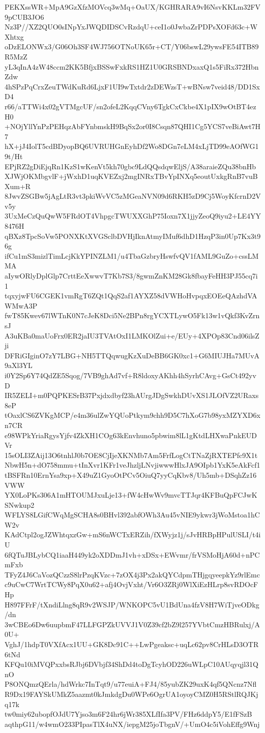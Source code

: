 PEKXssWR+MpA9GzXfzMOVcq3wMq+OaUX/KGHRARA9vI6NsvKKLm32FV9pCUB3JO6
Nz3P//XZ2QUO0sINpYxJWQDIDSCvRzdqU+ceI1o0JwbaZrPDPsXOFd63c+WXhtxg
oDzELONWx3/G06Oh3SF4WJ756OTNoUK65r+CT/Y06bswL29ywsFE54ITB89R5MzZ
yL3qInA4zW48ccm2KK5BfjxBSSwFxkRS1HZ1U0GRSBNDxaxQ1s5FiRx372HbnZdw
4hSPzPqCrxZeuTWdKuRd6LjxF1UI9wTxtdr2zDEWzsT+wBNsw7veid48/DD1SxD4
r66/aTTWi4x02gVTMgcUF/sn2ofeL2KqqCVny6TgkCxCkbe4X1pIX9wOtBT4ezH0
+NOjYllYnPzPEHqzAbFYnbmskH9BqSx2or0I8Csqn87QHI1Cg5YCS7veBiAwt7H7
hX+jJ4IolT5cdBDyopBQ6UVRUHGnEyhDf2Wo8DGn7eLM4xLjTD99eAOfWG19t/Ht
EPjRZ2gDiEjqRn1KzS1wKenVt5kh70gbc9LdQQsdqwEljS/A38araieZQu38bnHb
XJWjOKMbgvlF+jWxhD1uqKVEZxj2mgINRxTBvYpINXq5eoutUxkgRnB7vuBXum+R
8JwvZSGBw5jAgLtR3vt3pkiWvVC5zMGeaNVN09d6RKH5zD9Cj5WoyKfcrnD2Vv5y
3UxMeCzQuQwW5FRdOT4VhpgcTWUXXGhP75Ioxn7X1jjyZeoQ9iyu2+LE4YY8476H
qBXz8TpcSoVw5PONXKtXVGSclbDVHjIknAtmyIMuf6dhD1HzqP3in0Up7Kx3t96g
ifCu1mS3mizlTimLcjKkYPINZLM1/u4TbaGzbryHswfvQV1fAML9GuZo+cssLMMA
aIywORlyDplGlp7CrttEeXwwvT7Kb7S3/8gwmZnKM28Gk8fbayFeHH3PJ55cq7i1
tqxyjwFU6CGEK1vmRgT6ZQt1QqS2af1AYXZ58dVWHoHvpqxEOEeQAzhdVAWMwA3P
fwT85Kwev67lWTnK0N7cJeK8Dci5Ne2BPn8rgYCXTLywO5Fk13w1vQkf3KvZrnsJ
A3uKBa0maUoFrx0ER2jaIU3TVAtOxI1LMKOlZui+e/EUy+4XPOp83Cnd06ilsZji
DFRiGIginO7zY7LBG+NH5TTQqwugKzXuDeBB6GK0xc1+G6MIUJHa7MUvA9aXl3YL
i0Y2Sp6Y74QdZE5Sqog/7VB9ghAd7vf+R8ldoxyAKhh4hSyrhCAvg+GsCt492yvD
IR5ZELI+m0PQPKESrB37Pxjdxdbyf23hAUrgJDgSwkhDUvXS1JLOfVZ2URaxs8eP
tOaxlCS6ZVKgMCP/e4m36ulZwYQUoPtkym9chh9D5C7hXoG7b98yxMZYXD6xn7CR
e98WPkYriaRgysYjfv4ZkXH1COg63kEnvhuno5pbwim8lL1gKtdLHXwaPnkEUDVr
15sOLI3ZAij13O6tnhlJ0b7OE8CjIjeXKNMb7Am5FrfLogCtTNaZjRXTEPfc9X1t
NbwH5n+dO758mmu+tInXvr1KFr1veJhzljLNvjiwwwHlxJA9OIpb1YxK5eAkFcf1
tBSFRn10ErnYsa9xp+X49uZ1GyoOtPCv5OiuQ7yyCqKbv8/Uh5mb+DSqhZz16VWW
YX0LoPKs306A1mHTOUMJxuLje13+fW4cHwWv9mvcTTJqr4KFBuQpFCJwKSNwkup2
WFLYS8LGifCWqMgSCHA8s0BHvl392abfOWh3Au45vNIE9ykwr3jWoMstoa1hCW2v
KAdCtpl2ogJZWhtqxzGw+mS6nWCTxERZih/fXWyjz1j/sJvHRBpHPulUSLI/t4iU
6fQTuJBLybCQ1iaaH449yk2oXDDmJ1vh+xDSx+EWvmr/frVSMoHjA60d+nPCmFxb
TFyZ4J6CaVozQCzzS8lrPzqKVzc+7zOX4j3Px2akQYCdpmTHjgqyeepkYz9rlEmc
c9uCwC7WrtTCWy8PqX0u62+afj4OvjVxht/Vr6O3ZRj0WlXiEzHLrp8svRDOcFHp
H897FFrF/tXndiLlng8qR9v2WSJP/WNKOPC5vU1BdUna4fzV8H7WiTjveODkg/dn
3wCBEo6Dw6uupbmF47LLFGPZkUVVJ1V0Z39cf2bZ9l257YVbtCmzHBRulxj/A0U+
VghJ/1hdpT0VXfAcx1UU+GK8Dc91C++LwPgeaksc+uqLc62pv8CrHLsD3OTR6tNd
KFQu10iMVQPxxbsRJbj6DVbjf34ShDd4toDgTcyhOD226uWLpC10AUqyqjl31QnO
P8ONQmzQErla/hdWrkc7InTqt9/u77euiA+FJ4/85yubZK29uxK4qf5QNcnz7Nfl
R9Dx19FAYSkUMkZ5aazmt0kJmkdgDu0WPe6OgrUA1oyoyCMZ0H5RStlRQJKjq17k
tw0miy62ubopfOJdU7Yjso3m6F24hr6jWr385XLfIfa3PV/FHz6ddpY5/E1fFSzB
aqthpG11/w4wmO233PIpasTlX4uNX/iepgM25joTbgnV/+UmO4c5iVohEffg9Wnj
